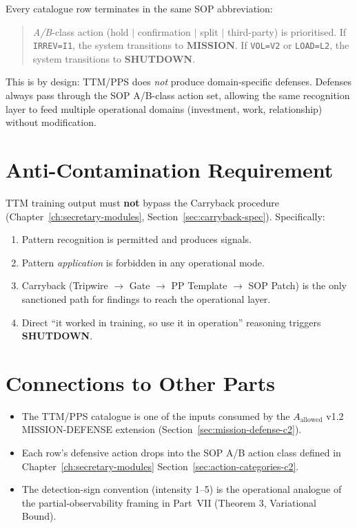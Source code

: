Every catalogue row terminates in the same SOP abbreviation:

\begin{quote}
\textit{A/B}-class action (hold $|$ confirmation $|$ split $|$
third-party) is prioritised. If \texttt{IRREV=I1}, the system
transitions to \textbf{MISSION}. If \texttt{VOL=V2} or
\texttt{LOAD=L2}, the system transitions to \textbf{SHUTDOWN}.
\end{quote}

This is by design: TTM/PPS does \emph{not} produce
domain-specific defenses. Defenses always pass through the SOP
A/B-class action set, allowing the same recognition layer to feed
multiple operational domains (investment, work, relationship)
without modification.

\section{Anti-Contamination Requirement}
\label{sec:ttm-sop-integration}

TTM training output must \textbf{not} bypass the Carryback procedure
(Chapter~\ref{ch:secretary-modules}, Section~\ref{sec:carryback-spec}).
Specifically:

\begin{enumerate}
\item Pattern recognition is permitted and produces signals.
\item Pattern \emph{application} is forbidden in any operational
mode.
\item Carryback (Tripwire $\to$ Gate $\to$ PP Template $\to$ SOP
Patch) is the only sanctioned path for findings to reach the
operational layer.
\item Direct ``it worked in training, so use it in operation''
reasoning triggers \textbf{SHUTDOWN}.
\end{enumerate}

\section*{Connections to Other Parts}

\begin{itemize}
\item The TTM/PPS catalogue is one of the inputs consumed by the
$A_{\mathrm{allowed}}$ v1.2 MISSION-DEFENSE extension
(Section~\ref{sec:mission-defense-c2}).
\item Each row's defensive action drops into the SOP A/B action
class defined in Chapter~\ref{ch:secretary-modules}
Section~\ref{sec:action-categories-c2}.
\item The detection-sign convention (intensity 1--5) is the
operational analogue of the partial-observability framing in
Part~VII (Theorem 3, Variational Bound).
\end{itemize}
